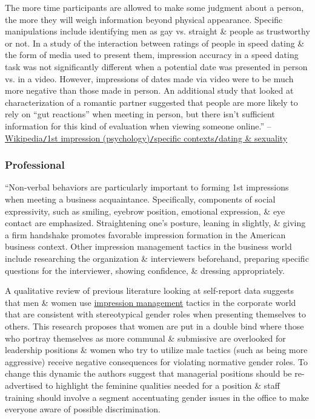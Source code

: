\documentclass[oneside]{book}
\numberwithin{equation}{section}
\begin{document}
The more time participants are allowed to make some judgment about a person, the more they will weigh information beyond physical appearance. Specific manipulations include identifying men as gay vs. straight \& people as trustworthy or not. In a study of the interaction between ratings of people in speed dating \& the form of media used to present them, impression accuracy in a speed dating task was not significantly different when a potential date was presented in person vs. in a video. However, impressions of dates made via video were to be much more negative than those made in person. An additional study that looked at characterization of a romantic partner suggested that people are more likely to rely on ``gut reactions'' when meeting in person, but there isn't sufficient information for this kind of evaluation when viewing someone online.'' -- \href{https://en.wikipedia.org/wiki/First_impression_(psychology)#Dating_and_sexuality}{Wikipedia\texttt{/}1st impression (psychology)\texttt{/}specific contexts\texttt{/}dating \& sexuality}

\subsubsection{Professional}
``Non-verbal behaviors are particularly important to forming 1st impressions when meeting a business acquaintance. Specifically, components of social expressivity, such as smiling, eyebrow position, emotional expression, \& eye contact are emphasized. Straightening one's posture, leaning in slightly, \& giving a firm handshake promotes favorable impression formation in the American business context. Other impression management tactics in the business world include researching the organization \& interviewers beforehand, preparing specific questions for the interviewer, showing confidence, \& dressing appropriately.

A qualitative review of previous literature looking at self-report data suggests that men \& women use \href{https://en.wikipedia.org/wiki/Impression_management}{impression management} tactics in the corporate world that are consistent with stereotypical gender roles when presenting themselves to others. This research proposes that women are put in a double bind where those who portray themselves as more communal \& submissive are overlooked for leadership positions \& women who try to utilize male tactics (such as being more aggressive) receive negative consequences for violating normative gender roles. To change this dynamic the authors suggest that managerial positions should be re-advertised to highlight the feminine qualities needed for a position \& staff training should involve a segment accentuating gender issues in the office to make everyone aware of possible discrimination.
\end{document}
